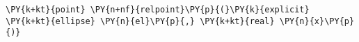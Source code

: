 \begin{Verbatim}[commandchars=\\\{\}]
    \PY{k+kt}{point} \PY{n+nf}{relpoint}\PY{p}{(}\PY{k}{explicit} \PY{k+kt}{ellipse} \PY{n}{el}\PY{p}{,} \PY{k+kt}{real} \PY{n}{x}\PY{p}{)}
\end{Verbatim}
